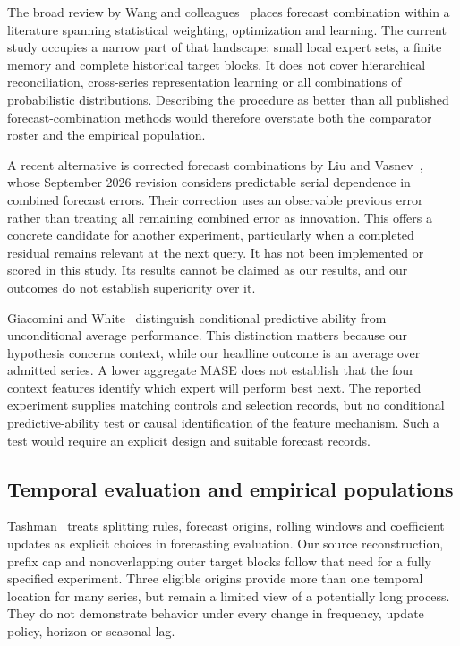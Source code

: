 The broad review by Wang and colleagues~\cite{wangreview} places forecast combination within a literature spanning statistical weighting, optimization and learning. The current study occupies a narrow part of that landscape: small local expert sets, a finite memory and complete historical target blocks. It does not cover hierarchical reconciliation, cross-series representation learning or all combinations of probabilistic distributions. Describing the procedure as better than all published forecast-combination methods would therefore overstate both the comparator roster and the empirical population.

A recent alternative is corrected forecast combinations by Liu and Vasnev~\cite{corrected}, whose September 2026 revision considers predictable serial dependence in combined forecast errors. Their correction uses an observable previous error rather than treating all remaining combined error as innovation. This offers a concrete candidate for another experiment, particularly when a completed residual remains relevant at the next query. It has not been implemented or scored in this study. Its results cannot be claimed as our results, and our outcomes do not establish superiority over it.

Giacomini and White~\cite{giacomini} distinguish conditional predictive ability from unconditional average performance. This distinction matters because our hypothesis concerns context, while our headline outcome is an average over admitted series. A lower aggregate MASE does not establish that the four context features identify which expert will perform best next. The reported experiment supplies matching controls and selection records, but no conditional predictive-ability test or causal identification of the feature mechanism. Such a test would require an explicit design and suitable forecast records.

\subsection{Temporal evaluation and empirical populations}
Tashman~\cite{tashman} treats splitting rules, forecast origins, rolling windows and coefficient updates as explicit choices in forecasting evaluation. Our source reconstruction, prefix cap and nonoverlapping outer target blocks follow that need for a fully specified experiment. Three eligible origins provide more than one temporal location for many series, but remain a limited view of a potentially long process. They do not demonstrate behavior under every change in frequency, update policy, horizon or seasonal lag.

